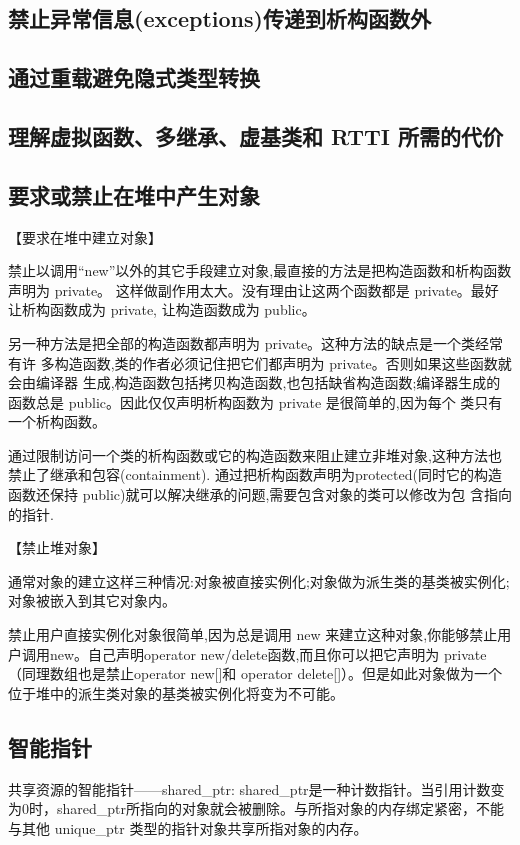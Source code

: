 \subsection{禁止异常信息(exceptions)传递到析构函数外}
\subsection{通过重载避免隐式类型转换}
\subsection{理解虚拟函数、多继承、虚基类和 RTTI 所需的代价}
\subsection{要求或禁止在堆中产生对象}

【要求在堆中建立对象】

禁止以调用“new”以外的其它手段建立对象,最直接的方法是把构造函数和析构函数声明为 private。 这样做副作用太大。没有理由让这两个函数都是 private。最好让析构函数成为 private, 让构造函数成为 public。

另一种方法是把全部的构造函数都声明为 private。这种方法的缺点是一个类经常有许 多构造函数,类的作者必须记住把它们都声明为 private。否则如果这些函数就会由编译器 生成,构造函数包括拷贝构造函数,也包括缺省构造函数;编译器生成的函数总是 public。因此仅仅声明析构函数为 private 是很简单的,因为每个 类只有一个析构函数。

通过限制访问一个类的析构函数或它的构造函数来阻止建立非堆对象,这种方法也禁止了继承和包容(containment). 通过把析构函数声明为protected(同时它的构造函数还保持 public)就可以解决继承的问题,需要包含对象的类可以修改为包
含指向的指针.

【禁止堆对象】

通常对象的建立这样三种情况:对象被直接实例化;对象做为派生类的基类被实例化; 对象被嵌入到其它对象内。

禁止用户直接实例化对象很简单,因为总是调用 new 来建立这种对象,你能够禁止用户调用new。自己声明operator new/delete函数,而且你可以把它声明为 private（同理数组也是禁止operator new[]和 operator delete[]）。但是如此对象做为一个位于堆中的派生类对象的基类被实例化将变为不可能。

\subsection{智能指针}
共享资源的智能指针——shared_ptr: shared_ptr是一种计数指针。当引用计数变为0时，shared_ptr所指向的对象就会被删除。与所指对象的内存绑定紧密，不能与其他 unique_ptr 类型的指针对象共享所指对象的内存。

